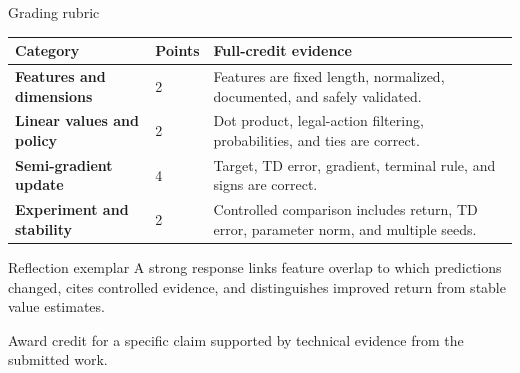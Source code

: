 \documentclass[aspectratio=169,11pt]{beamer}
\begin{document}
\begin{frame}{Grading rubric}
\scriptsize
\begin{tabularx}{\textwidth}{>{\bfseries}p{} p{} X}
\toprule
Category & Points & Full-credit evidence \\
\midrule
Features and dimensions & 2 & Features are fixed length, normalized, documented, and safely validated. \\
Linear values and policy & 2 & Dot product, legal-action filtering, probabilities, and ties are correct. \\
Semi-gradient update & 4 & Target, TD error, gradient, terminal rule, and signs are correct. \\
Experiment and stability & 2 & Controlled comparison includes return, TD error, parameter norm, and multiple seeds. \\
\bottomrule
\end{tabularx}
\end{frame}

\begin{frame}{Reflection exemplar}
\small
\answerlabel A strong response links feature overlap to which predictions changed, cites controlled evidence, and distinguishes improved return from stable value estimates.

\vspace{0.25cm}
\gradinglabel Award credit for a specific claim supported by technical evidence from the submitted work.
\end{frame}
\end{document}
